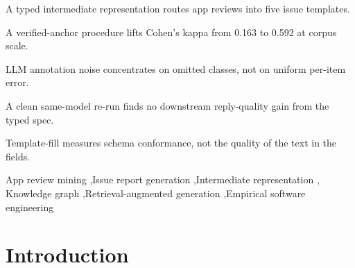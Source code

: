 \documentclass[preprint,12pt]{elsarticle}
\begin{document}
\begin{frontmatter}
\begin{abstract}
\textbf{Conclusions.} Typed issue specifications are producible at corpus scale, and that is the
contribution we defend. Pipelines of this shape should be evaluated on what the intermediate
representation produces rather than on its effect downstream, and a same-model comparison should
be the default before any such effect is claimed.

\end{abstract}

\begin{highlights}
\item A typed intermediate representation routes app reviews into five issue templates.
\item A verified-anchor procedure lifts Cohen's kappa from 0.163 to 0.592 at corpus scale.
\item LLM annotation noise concentrates on omitted classes, not on uniform per-item error.
\item A clean same-model re-run finds no downstream reply-quality gain from the typed spec.
\item Template-fill measures schema conformance, not the quality of the text in the fields.
\end{highlights}

\begin{keyword}
App review mining \sep Issue report generation \sep Intermediate representation \sep
Knowledge graph \sep Retrieval-augmented generation \sep Empirical software engineering
\end{keyword}

\end{frontmatter}


\section{Introduction}\label{introduction}
\end{document}
